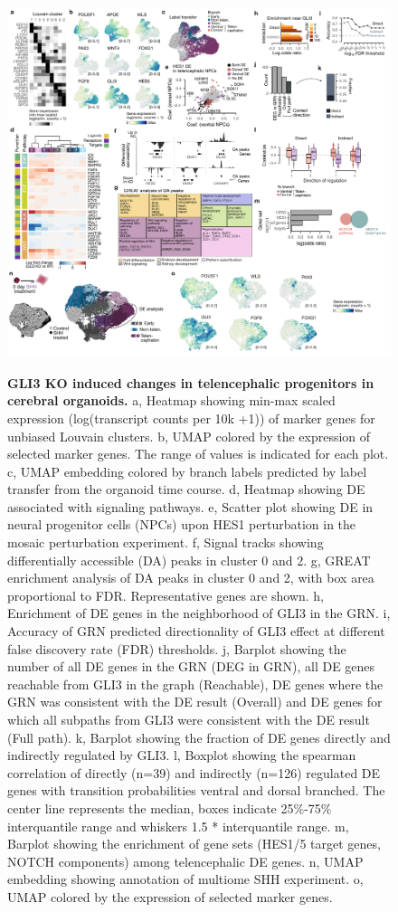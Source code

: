 \begin{figure}[h!]
    \centering
	\includegraphics[width=\textwidth]{figures/pando/Figure_S10}
    \label{fig:regS10}
    \caption{\textbf{GLI3 KO induced changes in telencephalic progenitors in cerebral organoids.} a, Heatmap showing min-max scaled expression (log(transcript counts per 10k +1)) of marker genes for unbiased Louvain clusters. b,  UMAP colored by the expression of selected marker genes. The range of values is indicated for each plot. c, UMAP embedding colored by branch labels predicted by label transfer from the organoid time course. d, Heatmap showing DE associated with signaling pathways. e, Scatter plot showing DE in neural progenitor cells (NPCs) upon HES1 perturbation in the mosaic perturbation experiment. f, Signal tracks showing differentially accessible (DA) peaks in cluster 0 and 2. g, GREAT enrichment analysis of DA peaks in cluster 0 and 2, with box area proportional to FDR. Representative genes are shown. h, Enrichment of DE genes in the neighborhood of GLI3 in the GRN. i, Accuracy of GRN predicted directionality of GLI3 effect at different false discovery rate (FDR) thresholds. j, Barplot showing the number of all DE genes in the GRN (DEG in GRN), all DE genes reachable from GLI3 in the graph (Reachable), DE genes where the GRN was consistent with the DE result (Overall) and DE genes for which all subpaths from GLI3 were consistent with the DE result (Full path). k, Barplot showing the fraction of DE genes directly and indirectly regulated by GLI3. l, Boxplot showing the spearman correlation of directly (n=39) and indirectly (n=126) regulated DE genes with transition probabilities ventral and dorsal branched. The center line represents the median, boxes indicate 25\%-75\% interquantile range and whiskers 1.5 * interquantile range. m, Barplot showing the enrichment of gene sets (HES1/5 target genes, NOTCH components) among telencephalic DE genes. n, UMAP embedding showing annotation of multiome SHH experiment. o, UMAP colored by the expression of selected marker genes.}
\end{figure}

